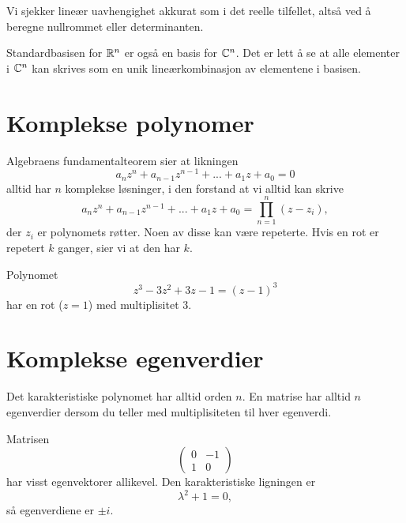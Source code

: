 \begin{ex}
Vi sjekker lineær uavhengighet akkurat som i det reelle tilfellet, altså ved å beregne nullrommet eller determinanten. 
\end{ex}

\begin{ex}
Standardbasisen for $\mathbb{R}^n$ er også en basis for $\mathbb{C}^n$. Det er lett å se at alle elementer i $\mathbb{C}^n$ kan skrives som en unik lineærkombinasjon av elementene i basisen.
\end{ex}



\section*{Komplekse polynomer}

Algebraens fundamentalteorem sier at likningen
\[
a_nz^n+a_{n-1}z^{n-1}+...+a_1z+a_0=0
\]
alltid har $n$ komplekse løsninger, i den forstand at vi alltid kan skrive
\[
a_nz^n+a_{n-1}z^{n-1}+...+a_1z+a_0=\prod_{n=1}^n (z-z_i),
\]
der $z_i$ er polynomets røtter. Noen av disse kan være repeterte. Hvis en rot er repetert $k$ ganger, sier vi at den har  $k$. 

\begin{ex}
Polynomet 
\[
z^3-3z^2+3z-1=(z-1)^3
\]
har en rot ($z=1$) med multiplisitet 3.
\end{ex}


\section*{Komplekse egenverdier}

\begin{thm}
Det karakteristiske polynomet har alltid orden $n$. 
En matrise har alltid $n$ egenverdier dersom du 
teller med multiplisiteten til hver egenverdi. 
\end{thm}

\begin{ex}
Matrisen
\[
\begin{pmatrix}
0 & -1 \\ 1 &0
\end{pmatrix}
\]
har visst egenvektorer allikevel. Den karakteristiske ligningen er 
\[
\lambda^2+1=0,
\]
så egenverdiene er $\pm i$. 
\end{ex}

